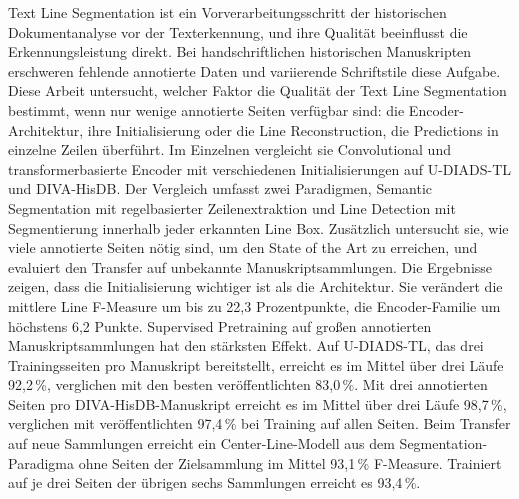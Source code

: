 \documentclass[twoside]{vutinfth}
\begin{document}
\frontmatter %



\begin{acknowledgements*}
\end{acknowledgements*}

\begin{kurzfassung}
    Text Line Segmentation ist ein Vorverarbeitungsschritt der historischen Dokumentanalyse vor der Texterkennung, und ihre Qualität beeinflusst die Erkennungsleistung direkt. Bei handschriftlichen historischen Manuskripten erschweren fehlende annotierte Daten und variierende Schriftstile diese Aufgabe. Diese Arbeit untersucht, welcher Faktor die Qualität der Text Line Segmentation bestimmt, wenn nur wenige annotierte Seiten verfügbar sind: die Encoder-Architektur, ihre Initialisierung oder die Line Reconstruction, die Predictions in einzelne Zeilen überführt. Im Einzelnen vergleicht sie Convolutional und transformerbasierte Encoder mit verschiedenen Initialisierungen auf U-DIADS-TL und DIVA-HisDB. Der Vergleich umfasst zwei Paradigmen, Semantic Segmentation mit regelbasierter Zeilenextraktion und Line Detection mit Segmentierung innerhalb jeder erkannten Line Box. Zusätzlich untersucht sie, wie viele annotierte Seiten nötig sind, um den State of the Art zu erreichen, und evaluiert den Transfer auf unbekannte Manuskriptsammlungen. Die Ergebnisse zeigen, dass die Initialisierung wichtiger ist als die Architektur. Sie verändert die mittlere Line F-Measure um bis zu 22,3 Prozentpunkte, die Encoder-Familie um höchstens 6,2 Punkte. Supervised Pretraining auf großen annotierten Manuskriptsammlungen hat den stärksten Effekt. Auf U-DIADS-TL, das drei Trainingsseiten pro Manuskript bereitstellt, erreicht es im Mittel über drei Läufe 92,2\,\%, verglichen mit den besten veröffentlichten 83,0\,\%. Mit drei annotierten Seiten pro DIVA-HisDB-Manuskript erreicht es im Mittel über drei Läufe 98,7\,\%, verglichen mit veröffentlichten 97,4\,\% bei Training auf allen Seiten. Beim Transfer auf neue Sammlungen erreicht ein Center-Line-Modell aus dem Segmentation-Paradigma ohne Seiten der Zielsammlung im Mittel 93,1\,\% F-Measure. Trainiert auf je drei Seiten der übrigen sechs Sammlungen erreicht es 93,4\,\%.
\end{kurzfassung}
\end{document}
